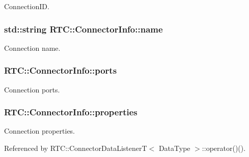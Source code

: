 ConnectionID. 

\subsubsection[{name}]{\setlength{\rightskip}{0pt plus 5cm}std::string {\bf RTC::ConnectorInfo::name}}\label{classRTC_1_1ConnectorInfo_a7cf9f73a6b055dc52f62d6b7cd92e97d}


Connection name. 

\subsubsection[{ports}]{ {\bf RTC::ConnectorInfo::ports}}\label{classRTC_1_1ConnectorInfo_a2424113611e0cdd498f526ac58f67fba}


Connection ports. 

\subsubsection[{properties}]{ {\bf RTC::ConnectorInfo::properties}}\label{classRTC_1_1ConnectorInfo_a480039d0964d885b3cac8e6d1ec64584}


Connection properties. 



Referenced by RTC::ConnectorDataListenerT$<$ DataType $>$::operator()().


